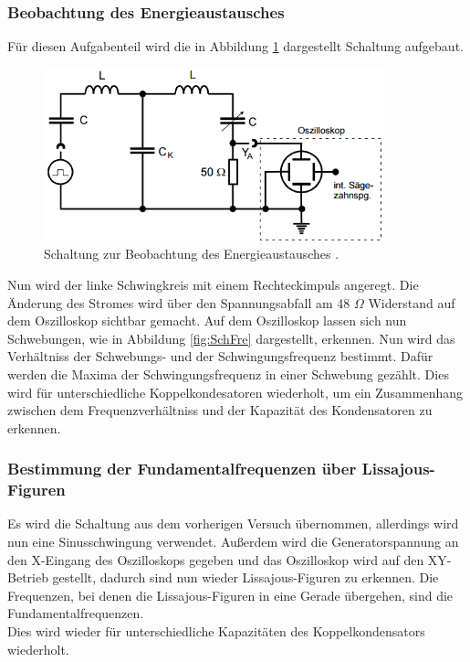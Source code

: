 \subsubsection{Beobachtung des Energieaustausches}
 Für diesen Aufgabenteil wird die in Abbildung \ref{fig:Blub} dargestellt Schaltung aufgebaut.

 \begin{figure}[H]
   \centering
   \includegraphics[height=5cm]{picture/Schwebefrequenz.PNG}
   \caption{Schaltung zur Beobachtung des Energieaustausches \cite{sample}.}
   \label{fig:Blub}
 \end{figure}

Nun wird der linke Schwingkreis mit einem Rechteckimpuls angeregt. Die Änderung des Stromes wird über den Spannungsabfall am 48 $\Omega$ Widerstand auf dem Oszilloskop sichtbar gemacht. Auf dem Oszilloskop lassen sich nun Schwebungen, wie in Abbildung \ref{fig:SchFre} dargestellt, erkennen. Nun wird das Verhältniss der Schwebungs- und der Schwingungsfrequenz bestimmt. Dafür werden die Maxima der Schwingungsfrequenz in einer Schwebung gezählt. Dies wird für unterschiedliche Koppelkondesatoren wiederholt, um ein Zusammenhang zwischen dem Frequenzverhältniss und der Kapazität des Kondensatoren zu erkennen.

\subsubsection{Bestimmung der Fundamentalfrequenzen über Lissajous-Figuren}
Es wird die Schaltung aus dem vorherigen Versuch übernommen, allerdings wird nun eine Sinusschwingung verwendet. Außerdem wird die Generatorspannung an den X-Eingang des Oszilloskops gegeben und das Oszilloskop wird auf den XY-Betrieb gestellt, dadurch sind nun wieder Lissajous-Figuren zu erkennen. Die Frequenzen, bei denen die Lissajous-Figuren in eine Gerade übergehen, sind die Fundamentalfrequenzen.\\
Dies wird wieder für unterschiedliche Kapazitäten des Koppelkondensators wiederholt.

